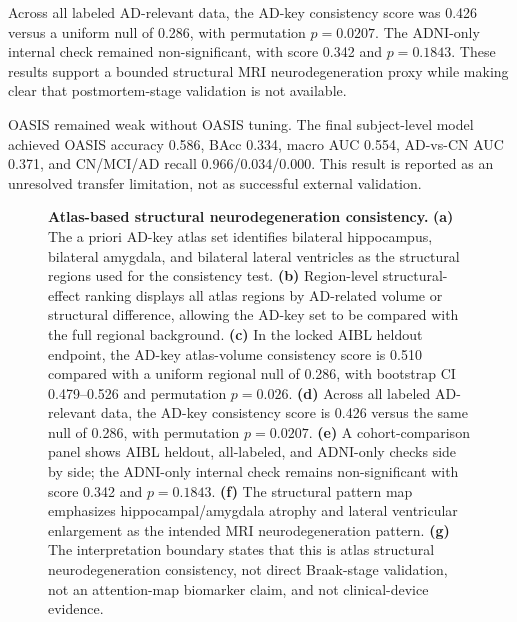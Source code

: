 \documentclass[12pt,a4paper]{article}
\begin{document}
Across all labeled AD-relevant data, the AD-key consistency score was 0.426 versus a uniform null of 0.286, with permutation $p=0.0207$. The ADNI-only internal check remained non-significant, with score 0.342 and $p=0.1843$. These results support a bounded structural MRI neurodegeneration proxy while making clear that postmortem-stage validation is not available.

OASIS remained weak without OASIS tuning. The final subject-level model achieved OASIS accuracy 0.586, BAcc 0.334, macro AUC 0.554, AD-vs-CN AUC 0.371, and CN/MCI/AD recall 0.966/0.034/0.000. This result is reported as an unresolved transfer limitation, not as successful external validation.

\begin{figure}[p]
    \centering
    \caption{\textbf{Atlas-based structural neurodegeneration consistency.} \textbf{(a)} The a priori AD-key atlas set identifies bilateral hippocampus, bilateral amygdala, and bilateral lateral ventricles as the structural regions used for the consistency test. \textbf{(b)} Region-level structural-effect ranking displays all atlas regions by AD-related volume or structural difference, allowing the AD-key set to be compared with the full regional background. \textbf{(c)} In the locked AIBL heldout endpoint, the AD-key atlas-volume consistency score is 0.510 compared with a uniform regional null of 0.286, with bootstrap CI 0.479--0.526 and permutation $p=0.026$. \textbf{(d)} Across all labeled AD-relevant data, the AD-key consistency score is 0.426 versus the same null of 0.286, with permutation $p=0.0207$. \textbf{(e)} A cohort-comparison panel shows AIBL heldout, all-labeled, and ADNI-only checks side by side; the ADNI-only internal check remains non-significant with score 0.342 and $p=0.1843$. \textbf{(f)} The structural pattern map emphasizes hippocampal/amygdala atrophy and lateral ventricular enlargement as the intended MRI neurodegeneration pattern. \textbf{(g)} The interpretation boundary states that this is atlas structural neurodegeneration consistency, not direct Braak-stage validation, not an attention-map biomarker claim, and not clinical-device evidence.}
    \label{fig:v6_biology}
\end{figure}
\end{document}
